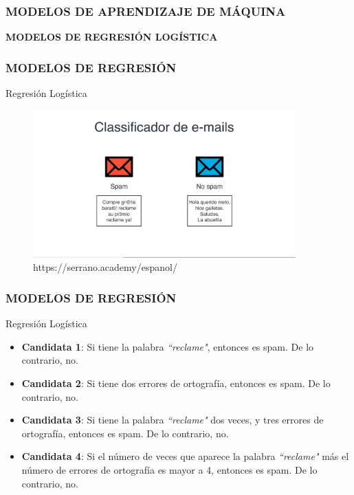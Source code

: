 \documentclass{beamer}
\begin{document}
\begin{frame}
		\frametitle{MODELOS DE APRENDIZAJE DE MÁQUINA}
	\begin{block}{}	
		\center
		\textbf{MODELOS DE REGRESIÓN LOGÍSTICA}
	\end{block}
\end{frame}

\begin{frame}
	\frametitle{MODELOS DE REGRESIÓN}
	\begin{block}{Regresión Logística}	
		\begin{figure}
			\includegraphics[width=0.9\textwidth]{Imagenes_reg_log/IMG_3490.jpg}
			\caption{https://serrano.academy/espanol/}
		\end{figure}
	\end{block}
\end{frame}

\begin{frame}
	\frametitle{MODELOS DE REGRESIÓN}
	\begin{block}{Regresión Logística}	
		\begin{itemize}
			\item \textbf{Candidata 1}: Si tiene la palabra \textit{``reclame"}, entonces es spam. De lo contrario, no.
			\item \textbf{Candidata 2}: Si tiene dos errores de ortografía, entonces es spam. De lo contrario, no.
			\item \textbf{Candidata 3}: Si tiene la palabra \textit{``reclame"} dos veces, y tres errores de ortografía, entonces es spam. De lo contrario, no.
			\item \textbf{Candidata 4}: Si el número de veces que aparece la palabra \textit{``reclame"} más el número de errores de ortografía es mayor a 4, entonces es spam. De lo contrario, no.
		\end{itemize}
	\end{block}
\end{frame}
\end{document}
